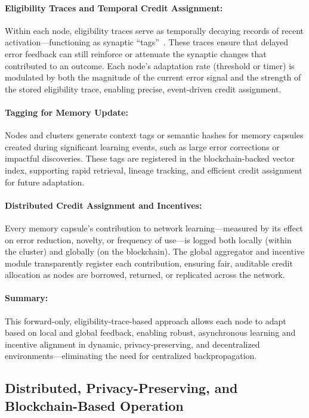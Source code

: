 \documentclass[11pt]{article}
\begin{document}
\paragraph{Eligibility Traces and Temporal Credit Assignment:}
Within each node, eligibility traces serve as temporally decaying records of recent activation—functioning as synaptic “tags”~\cite{Gerstner2018, Frey1997}. These traces ensure that delayed error feedback can still reinforce or attenuate the synaptic changes that contributed to an outcome. Each node’s adaptation rate (threshold or timer) is modulated by both the magnitude of the current error signal and the strength of the stored eligibility trace, enabling precise, event-driven credit assignment.

\paragraph{Tagging for Memory Update:}
Nodes and clusters generate context tags or semantic hashes for memory capsules created during significant learning events, such as large error corrections or impactful discoveries. These tags are registered in the blockchain-backed vector index, supporting rapid retrieval, lineage tracking, and efficient credit assignment for future adaptation.

\paragraph{Distributed Credit Assignment and Incentives:}
Every memory capsule’s contribution to network learning—measured by its effect on error reduction, novelty, or frequency of use—is logged both locally (within the cluster) and globally (on the blockchain). The global aggregator and incentive module transparently register each contribution, ensuring fair, auditable credit allocation as nodes are borrowed, returned, or replicated across the network.

\paragraph{Summary:}
This forward-only, eligibility-trace-based approach allows each node to adapt based on local and global feedback, enabling robust, asynchronous learning and incentive alignment in dynamic, privacy-preserving, and decentralized environments—eliminating the need for centralized backpropagation.

\subsection{Distributed, Privacy-Preserving, and Blockchain-Based Operation}
\end{document}
